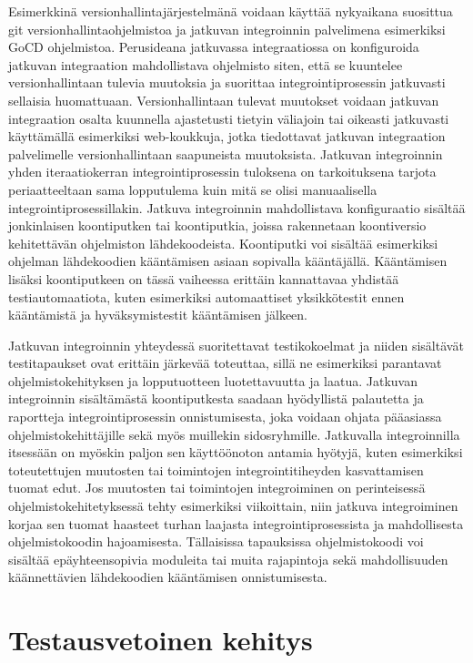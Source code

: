   Esimerkkinä versionhallintajärjestelmänä voidaan käyttää nykyaikana suosittua git versionhallintaohjelmistoa ja jatkuvan integroinnin palvelimena esimerkiksi GoCD ohjelmistoa.
  Perusideana jatkuvassa integraatiossa on konfiguroida jatkuvan integraation mahdollistava ohjelmisto siten, että se kuuntelee versionhallintaan tulevia muutoksia ja suorittaa integrointiprosessin jatkuvasti sellaisia huomattuaan.
  Versionhallintaan tulevat muutokset voidaan jatkuvan integraation osalta kuunnella ajastetusti tietyin väliajoin tai oikeasti jatkuvasti käyttämällä esimerkiksi web-koukkuja, jotka tiedottavat jatkuvan integraation palvelimelle versionhallintaan saapuneista muutoksista.
  Jatkuvan integroinnin yhden iteraatiokerran integrointiprosessin tuloksena on tarkoituksena tarjota periaatteeltaan sama lopputulema kuin mitä se olisi manuaalisella integrointiprosessillakin.
  Jatkuva integroinnin mahdollistava konfiguraatio sisältää jonkinlaisen koontiputken tai koontiputkia, joissa rakennetaan koontiversio kehitettävän ohjelmiston lähdekoodeista.
  Koontiputki voi sisältää esimerkiksi ohjelman lähdekoodien kääntämisen asiaan sopivalla kääntäjällä.
  Kääntämisen lisäksi koontiputkeen on tässä vaiheessa erittäin kannattavaa yhdistää testiautomaatiota, kuten esimerkiksi automaattiset yksikkötestit ennen kääntämistä ja hyväksymistestit kääntämisen jälkeen.

  Jatkuvan integroinnin yhteydessä suoritettavat testikokoelmat ja niiden sisältävät testitapaukset ovat erittäin järkevää toteuttaa, sillä ne esimerkiksi parantavat ohjelmistokehityksen ja lopputuotteen luotettavuutta ja laatua.
  Jatkuvan integroinnin sisältämästä koontiputkesta saadaan hyödyllistä palautetta ja raportteja integrointiprosessin onnistumisesta, joka voidaan ohjata pääasiassa ohjelmistokehittäjille sekä myös muillekin sidosryhmille.
  Jatkuvalla integroinnilla itsessään on myöskin paljon sen käyttöönoton antamia hyötyjä, kuten esimerkiksi toteutettujen muutosten tai toimintojen integrointitiheyden kasvattamisen tuomat edut.
  Jos muutosten tai toimintojen integroiminen on perinteisessä ohjelmistokehitetyksessä tehty esimerkiksi viikoittain, niin jatkuva integroiminen korjaa sen tuomat haasteet turhan laajasta integrointiprosessista ja mahdollisesta ohjelmistokoodin hajoamisesta.
  Tällaisissa tapauksissa ohjelmistokoodi voi sisältää epäyhteensopivia moduleita tai muita rajapintoja sekä mahdollisuuden käännettävien lähdekoodien kääntämisen onnistumisesta.

\section{Testausvetoinen kehitys} \label{ch:07_testausvetoinen_kehitys}

